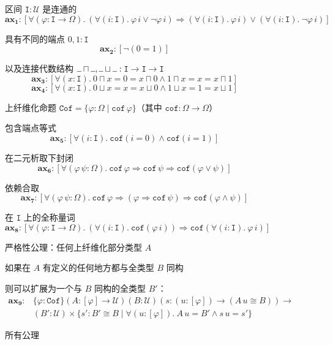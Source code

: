 \documentclass{ctexrep}
\theoremstyle{plain}
\theoremstyle{definition}
\theoremstyle{remark}
\newcommand{\Cof}{\mathtt{Cof}}
\newcommand{\ax}[1]{\mathbf{ax_{#1}}}
\newcommand{\ul}{{\rule[0ex]{0.5em}{0.4pt}}} %
\begin{document}
\begin{figure}[htbp]
\centering

区间 $\mathtt{I} : \mathcal{U}$ 是连通的
\[
\ax{1} : [\forall(\varphi : \mathtt{I} \to \Omega).\ (\forall(i : \mathtt{I}).\ \varphi\,i \lor \neg\varphi\,i) \Rightarrow (\forall(i : \mathtt{I}).\ \varphi\,i) \lor (\forall(i : \mathtt{I}).\ \neg\varphi\,i)]
\]

具有不同的端点 $0, 1 : \mathtt{I}$
\[
\ax{2} : [\neg(0 = 1)]
\]

以及连接代数结构 $\ul \sqcap\ul , \ul \sqcup\ul  : \mathtt{I} \to \mathtt{I} \to \mathtt{I}$
\[
\ax{3} : [\forall(x : \mathtt{I}).\ 0 \sqcap x = 0 = x \sqcap 0 \land 1 \sqcap x = x = x \sqcap 1]
\]
\[
\ax{4} : [\forall(x : \mathtt{I}).\ 0 \sqcup x = x = x \sqcup 0 \land 1 \sqcup x = 1 = x \sqcup 1]
\]

\vspace{1em}

上纤维化命题 $\Cof = \{\varphi : \Omega \mid \mathtt{cof}\,\varphi\}$（其中 $\mathtt{cof} : \Omega \to \Omega$）

包含端点等式
\[
\ax{5} : [\forall(i : \mathtt{I}).\ \mathtt{cof}(i = 0) \land \mathtt{cof}(i = 1)]
\]

在二元析取下封闭
\[
\ax{6} : [\forall(\varphi\,\psi : \Omega).\ \mathtt{cof}\,\varphi \Rightarrow \mathtt{cof}\,\psi \Rightarrow \mathtt{cof}(\varphi \lor \psi)]
\]

依赖合取
\[
\ax{7} : [\forall(\varphi\,\psi : \Omega).\ \mathtt{cof}\,\varphi \Rightarrow (\varphi \Rightarrow \mathtt{cof}\,\psi) \Rightarrow \mathtt{cof}(\varphi \land \psi)]
\]

在 $\mathtt{I}$ 上的全称量词
\[
\ax{8} : [\forall(\varphi : \mathtt{I} \to \Omega).\ (\forall(i : \mathtt{I}).\ \mathtt{cof}(\varphi\,i)) \Rightarrow \mathtt{cof}(\forall(i : \mathtt{I}).\ \varphi\,i)]
\]

\vspace{1em}

严格性公理：任何上纤维化部分类型 $A$

如果在 $A$ 有定义的任何地方都与全类型 $B$ 同构

则可以扩展为一个与 $B$ 同构的全类型 $B'$：
\begin{align*}
\ax{9} : &\{\varphi : \Cof\}(A : [\varphi] \to \mathcal{U})(B : \mathcal{U})(s : (u : [\varphi]) \to (A\,u \cong B)) \to \\
&(B' : \mathcal{U}) \times \{s' : B' \cong B \mid \forall(u : [\varphi]).\ A\,u = B' \land s\,u = s'\}
\end{align*}

\caption{所有公理}
\label{fig:all-axioms}

\end{figure}
\end{document}
